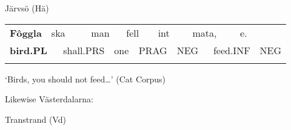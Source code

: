 
\begin{styleExLtrTblii}
Järvsö (Hä)

\end{styleExLtrTblii}

\begin{tabular}{llllllllllllll}
\lsptoprule
{\bfseries Fôggla} & \multicolumn{2}{l}{ska

} & \multicolumn{2}{l}{man

} & \multicolumn{2}{l}{fell

} & \multicolumn{2}{l}{int

} & \multicolumn{2}{l}{mata,

} & \multicolumn{2}{l}{e.

} & \\
\multicolumn{2}{l}{{\bfseries bird.PL}

} & \multicolumn{2}{l}{shall.PRS

} & \multicolumn{2}{l}{one

} & \multicolumn{2}{l}{PRAG

} & \multicolumn{2}{l}{NEG

} & \multicolumn{2}{l}{feed.INF

} & \multicolumn{2}{l}{NEG

}\\
\lspbottomrule
\end{tabular}

\begin{styleTranslation}
‘Birds, you should not feed…’ (Cat Corpus)

\end{styleTranslation}

Likewise Västerdalarna:


\begin{listWWNumileveli}
\item {}

\begin{styleExample}
Transtrand (Vd) 

\end{styleExample}

\end{listWWNumileveli}


